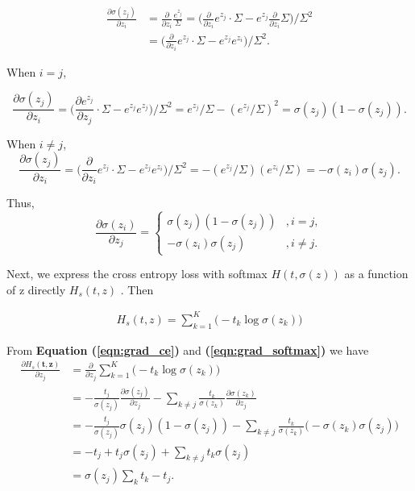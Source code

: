 \documentclass[12pt]{article}
\newcommand{\parder}[2] {
  \frac{\partial{#1} }{\partial{#2}}
}
\begin{document}
\begin{align*}
\parder{\sigma(z_j)}{z_i} &= \parder{}{z_i} \frac{e^{z_j}}{\Sigma}
= \Big( \parder{}{z_i} e^{z_j} \cdot \Sigma - e^{z_j} \parder{}{z_i} \Sigma \Big) / \Sigma^2 \\
&= \Big( \parder{}{z_i} e^{z_j} \cdot \Sigma - e^{z_j} e^{z_i} \Big) / \Sigma^2.
\end{align*}

When $i = j$,

$$\parder{\sigma(z_j)}{z_i} = \big(\parder{e^{z_j}}{z_j} \cdot \Sigma - e^{z_j}e^{z_j}\big) / \Sigma^2
= e^{z_j} / \Sigma - (e^{z_j} / \Sigma)^2 = \sigma(z_j)(1 - \sigma(z_j)).
$$

When $i \neq j$,
$$\parder{\sigma(z_j)}{z_i} = \Big( \parder{}{z_i} e^{z_j} \cdot \Sigma - e^{z_j} e^{z_i} \Big) / \Sigma^2
= -(e^{z_j}/\Sigma) (e^{z_i} / \Sigma) = -\sigma(z_i)\sigma(z_j).
$$

Thus,
\begin{equation}
\label{eqn:grad_softmax}
\parder{\sigma(z_i)}{z_j} = \begin{cases}
  \sigma(z_j)(1 - \sigma(z_j)) &, i = j, \\
  -\sigma(z_i)\sigma(z_j) &, i \neq j.
\end{cases}
\end{equation}

Next, we express the cross entropy loss with softmax $H(t, \sigma(z))$ as a function of z directly $H_s(t,z)$ . 
Then

\begin{align*}
H_s(t, z) = \sum_{k=1}^K \big(-t_k \log \sigma(z_k)\big)
\end{align*}

From \textbf{Equation (\ref{eqn:grad_ce})} and \textbf{(\ref{eqn:grad_softmax})} we have
\begin{align*}
\parder{H_s(\textbf{t}, \textbf{z})}{z_j} &= \parder{}{z_j} \sum_{k=1}^K \big(-t_k \log \sigma(z_k)\big) \\
&= -\frac{t_j}{\sigma(z_j)} \parder{\sigma(z_j)}{z_j} - \sum_{k \neq j} \frac{t_k}{\sigma(z_k)} \parder{\sigma(z_k)}{z_j} \\
&= -\frac{t_j}{\sigma(z_j)} \sigma(z_j)(1-\sigma(z_j)) - \sum_{k \neq j} \frac{t_k}{\sigma(z_k)} \big( -\sigma(z_k)\sigma(z_j)\big) \\
&= -t_j + t_j\sigma(z_j) + \sum_{k \neq j} t_k \sigma(z_j) \\
&= \sigma(z_j)\sum_k t_k - t_j.
\end{align*}
\end{document}
